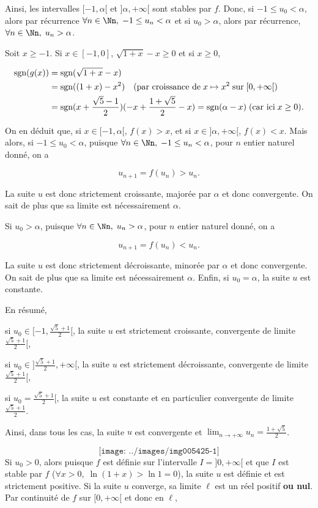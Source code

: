 {{Ainsi, les intervalles $[-1,\alpha[$ et $]\alpha,+\infty[$ sont stables par $f$. Donc, si $-1\leq u_0<\alpha$, alors par récurrence $\forall n\in\Nn,\;-1\leq u_n<\alpha$ et si $u_0>\alpha$, alors par récurrence, $\forall n\in\Nn,\;u_n>\alpha$.

Soit $x\geq-1$. Si $x\in[-1,0]$, $\sqrt{1+x}-x\geq0$ et si $x\geq0$,

\begin{align*}\ensuremath
\mbox{sgn}(g(x))&=\mbox{sgn}(\sqrt{1+x}-x)\\
 &=\mbox{sgn}((1+x)-x^2)\quad(\mbox{par croissance de}\;x\mapsto x^2\;\mbox{sur}\;[0,+\infty[)\\
 &=\mbox{sgn}(x+\frac{\sqrt{5}-1}{2})(-x+\frac{1+\sqrt{5}}{2}-x)=\mbox{sgn}(\alpha-x)\;(\mbox{car ici}\;x\geq0).
\end{align*}

On en déduit que, si $x\in[-1,\alpha[$, $f(x)>x$, et si $x\in]\alpha,+\infty[$, $f(x)<x$. Mais alors, 
si $-1\leq u_0<\alpha$, puisque $\forall n\in\Nn,\;-1\leq u_n<\alpha$, pour $n$ entier naturel donné, on a

$$u_{n+1}=f(u_n)>u_n.$$

La suite $u$ est donc strictement croissante, majorée par $\alpha$ et donc convergente. On sait de plus que sa limite est nécessairement $\alpha$.

Si $u_0>\alpha$, puisque $\forall n\in\Nn,\;u_n>\alpha$, pour $n$ entier naturel donné, on a

$$u_{n+1}=f(u_n)<u_n.$$

La suite $u$ est donc strictement décroissante, minorée par $\alpha$ et donc convergente. On sait de plus que sa limite est nécessairement $\alpha$. Enfin, si $u_0=\alpha$, la suite $u$ est constante.

En résumé,

si $u_0\in[-1,\frac{\sqrt{5}+1}{2}[$, la suite $u$ est strictement croissante, convergente de limite $\frac{\sqrt{5}+1}{2}[$,

si $u_0\in]\frac{\sqrt{5}+1}{2},+\infty[$, la suite $u$ est strictement décroissante, convergente de limite $\frac{\sqrt{5}+1}{2}[$,

si $u_0=\frac{\sqrt{5}+1}{2}[$, la suite $u$ est constante et en particulier convergente de limite $\frac{\sqrt{5}+1}{2}$.

Ainsi, dans tous les cas, la suite $u$ est convergente et $\lim_{n\rightarrow +\infty}u_n=\frac{1+\sqrt{5}}{2}$.

$$\texttt{[image: ../images/img005425-1]}$$
Si $u_0>0$, alors puisque $f$ est définie sur l'intervalle $I=]0,+\infty[$ et que $I$ est stable par $f$ ($\forall x>0,\;\ln(1+x)>\ln1=0$), la suite $u$ est définie et est strictement positive. Si la suite $u$ converge, sa limite $\ell$ est un réel positif \textbf{ou nul}. Par continuité de $f$ sur $[0,+\infty[$ et donc en $\ell$,

}}

